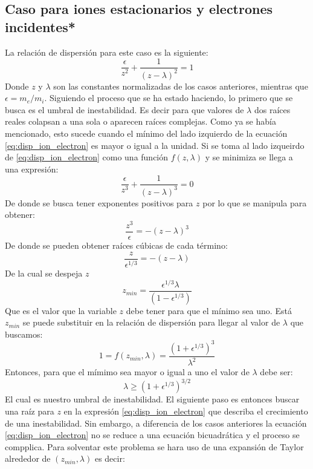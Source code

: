 \documentclass[12pt]{article}
\begin{document}
\subsection*{Caso para iones estacionarios y electrones incidentes*}
La relación de dispersión para este caso es la siguiente:
\begin{equation}
\label{eq:disp_ion_electron}
\frac{\epsilon}{z^2}+\frac{1}{(z-\lambda)^2}=1
\end{equation}
Donde $z$ y $\lambda$ son las constantes normalizadas de los casos anteriores, mientras que $\epsilon = m_e/m_i$.
Siguiendo el proceso que se ha estado haciendo, lo primero que se busca es el umbral de inestabilidad. Es decir para que valores de $\lambda$ dos raíces reales colapsan a una sola o aparecen raíces complejas. Como ya se había mencionado, esto sucede cuando el mínimo del lado izquierdo de la ecuación \ref{eq:disp_ion_electron} es mayor o igual a la unidad. Si se toma al lado izqueirdo de \ref{eq:disp_ion_electron} como una función $f(z,\lambda)$ y se minimiza se llega a una expresión:
\begin{equation}
\frac{\epsilon}{z^3}+\frac{1}{(z-\lambda)^3}=0
\end{equation}
De donde se busca tener exponentes positivos para $z$ por lo que se manipula para obtener:
\begin{equation}
\frac{z^3}{\epsilon}=-(z-\lambda)^3
\end{equation}
De donde se pueden obtener raíces cúbicas de cada término:
\begin{equation}
\frac{z}{\epsilon ^{1/3}}=-(z-\lambda)
\end{equation}
De la cual se despeja $z$
\begin{equation}
z_{min}=\frac{\epsilon ^{1/3}\lambda}{(1- \epsilon^{1/3})}
\end{equation}
Que es el valor que la variable $z$ debe tener para que el mínimo sea uno. Está $z_{min}$ se puede substituir en la relación de dispersión para llegar al valor de $\lambda$ que buscamos:
\begin{equation}
1=f(z_{min},\lambda)=\frac{(1+\epsilon^{1/3})^3}{\lambda^2}
\end{equation}
Entonces, para que el mímimo sea mayor o igual a uno el valor de $\lambda$ debe ser:
\begin{equation}
\label{eq:umbral_ion_electron}
\lambda \geq (1+\epsilon^{1/3})^{3/2}
\end{equation}
El cual es nuestro umbral de inestabilidad.
El siguiente paso es entonces buscar una raíz para $z$ en la expresión \ref{eq:disp_ion_electron} que describa el crecimiento de una inestabilidad. Sin embargo, a diferencia de los casos anteriores la ecuación \ref{eq:disp_ion_electron} no se reduce a una ecuación bicuadrática y el proceso se compplica. Para solventar este problema se hara uso de una expansión de Taylor alrededor de $(z_{min},\lambda)$ es decir:
\end{document}
